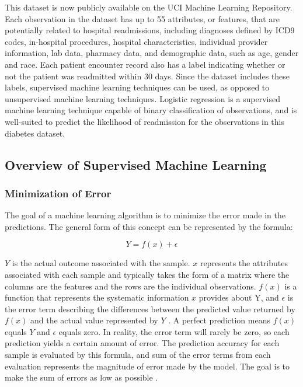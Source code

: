 \documentclass[sigconf]{acmart}
\begin{document}
This dataset is now publicly available on the UCI Machine Learning Repository. Each observation in the dataset has up to 55 attributes, or features, that are potentially related to hospital readmissions, including diagnoses defined by ICD9 codes, in-hospital procedures, hospital characteristics, individual provider information, lab data, pharmacy data, and demographic data, such as age, gender and race. Each patient encounter record also has a label indicating whether or not the patient was readmitted within 30 days. Since the dataset includes these labels, supervised machine learning techniques can be used, as opposed to unsupervised machine learning techniques. Logistic regression is a supervised machine learning technique capable of binary classification of observations, and is well-suited to predict the likelihood of readmission for the observations in this diabetes dataset.

\subsection{Overview of Supervised Machine Learning}

\subsubsection{Minimization of Error}

The goal of a machine learning algorithm is to minimize the error made in the predictions. The general form of this concept can be represented by the formula:

\[Y = f(x) + \epsilon\]

\(Y\) is the actual outcome associated with the sample. \(x\) represents the attributes associated with each sample and typically takes the form of a matrix where the columns are the features and the rows are the individual observations. \(f(x)\) is a function that represents the systematic information \(x\) provides about Y, and \(\epsilon\) is the error term describing the differences between the predicted value returned by \(f(x)\) and the actual value represented by \(Y\) \cite{cite03}. A perfect prediction means \(f(x)\) equals \(Y\) and \(\epsilon\) equals zero. In reality, the error term will rarely be zero, so each prediction yields a certain amount of error. The prediction accuracy for each sample is evaluated by this formula, and sum of the error terms from each evaluation represents the magnitude of error made by the model. The goal is to make the sum of errors as low as possible \cite{cite03}.
\end{document}
